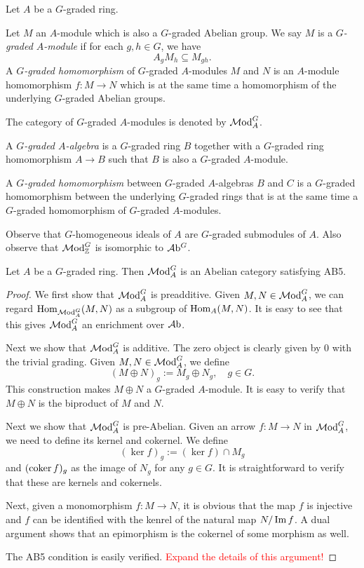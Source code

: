 \begin{definition}
    Let $A$ be a $G$-graded ring. 
    
    Let $M$ an $A$-module which is also a $G$-graded Abelian group. We say $M$ is a \emph{$G$-graded $A$-module} if for each $g,h\in G$, we have
    \[
        A_gM_h\subseteq M_{gh}.  
    \]
    A \emph{$G$-graded homomorphism} of $G$-graded $A$-modules $M$ and $N$ is an $A$-module homomorphism $f:M\rightarrow N$ which is at the same time a homomorphism of  the underlying $G$-graded Abelian groups.

    The category of $G$-graded $A$-modules is denoted by $\mathcal{M}\mathrm{od}^G_A$.

    A \emph{$G$-graded $A$-algebra} is a $G$-graded ring $B$ together with a $G$-graded ring homomorphism $A\rightarrow B$ such that $B$ is also a $G$-graded $A$-module.

    A \emph{$G$-graded homomorphism} between $G$-graded $A$-algebras $B$ and $C$ is a $G$-graded homomorphism between the underlying $G$-graded rings that is at the same time a $G$-graded homomorphism of $G$-graded $A$-modules.
\end{definition}
Observe that $G$-homogeneous ideals of $A$ are $G$-graded submodules of $A$. Also observe that $\mathcal{M}\mathrm{od}^G_{\mathbb{Z}}$ is isomorphic to $\mathcal{A}\mathrm{b}^G$.

\begin{proposition}
    Let $A$ be a $G$-graded ring. Then $\mathcal{M}\mathrm{od}^G_A$ is an Abelian category satisfying AB5.
\end{proposition}
\begin{proof}
    We first show that $\mathcal{M}\mathrm{od}^G_A$ is preadditive. Given $M,N\in \mathcal{M}\mathrm{od}^G_A$, we can regard $\operatorname{Hom}_{\mathcal{M}\mathrm{od}^G_A}(M,N)$ as a subgroup of $\operatorname{Hom}_A(M,N)$. It is easy to see that this gives $\mathcal{M}\mathrm{od}^G_A$ an enrichment over $\mathcal{A}\mathrm{b}$.

    Next we show that $\mathcal{M}\mathrm{od}^G_A$ is additive. The zero object is clearly given by $0$ with the trivial grading. Given $M,N\in \mathcal{M}\mathrm{od}^G_A$, we define
    \[
        (M\oplus N)_g:=M_g\oplus N_g,\quad g\in G.
    \]
    This construction makes $M\oplus N$ a $G$-graded $A$-module. It is easy to verify that $M\oplus N$ is the biproduct of $M$ and $N$.

    Next we show that $\mathcal{M}\mathrm{od}^G_A$ is pre-Abelian. Given an arrow $f:M\rightarrow N$ in  $\mathcal{M}\mathrm{od}^G_A$, we need to define its kernel and cokernel. We define
    \[
        (\ker f)_g:=(\ker f)\cap M_g  
    \]
    and $(\operatorname{coker} f)_g$ as the image of $N_g$ for any $g\in G$. It is straightforward to verify that these are kernels and cokernels.

    Next, given a monomorphism $f:M\rightarrow N$, it is obvious that the map $f$ is injective and $f$ can be identified with the kenrel of the natural map $N/\operatorname{Im} f$. A dual argument shows that an epimorphism is the cokernel of some morphism as well.

    The AB5 condition is easily verified. \textcolor{red}{Expand the details of this argument!}
\end{proof}

